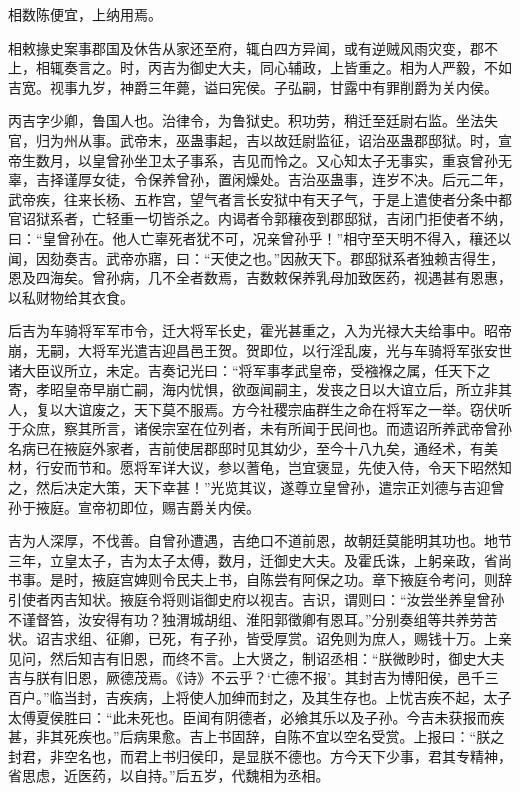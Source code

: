 \documentclass[]{article}
\begin{document}
相数陈便宜，上纳用焉。

相敕掾史案事郡国及休告从家还至府，辄白四方异闻，或有逆贼风雨灾变，郡不上，相辄奏言之。时，丙吉为御史大夫，同心辅政，上皆重之。相为人严毅，不如吉宽。视事九岁，神爵三年薨，谥曰宪侯。子弘嗣，甘露中有罪削爵为关内侯。

丙吉字少卿，鲁国人也。治律令，为鲁狱史。积功劳，稍迁至廷尉右监。坐法失官，归为州从事。武帝末，巫蛊事起，吉以故廷尉监征，诏治巫蛊郡邸狱。时，宣帝生数月，以皇曾孙坐卫太子事系，吉见而怜之。又心知太子无事实，重哀曾孙无辜，吉择谨厚女徒，令保养曾孙，置闲燥处。吉治巫蛊事，连岁不决。后元二年，武帝疾，往来长杨、五柞宫，望气者言长安狱中有天子气，于是上遣使者分条中都官诏狱系者，亡轻重一切皆杀之。内谒者令郭穰夜到郡邸狱，吉闭门拒使者不纳，曰：``皇曾孙在。他人亡辜死者犹不可，况亲曾孙乎！''相守至天明不得入，穰还以闻，因劾奏吉。武帝亦寤，曰：``天使之也。''因赦天下。郡邸狱系者独赖吉得生，恩及四海矣。曾孙病，几不全者数焉，吉数敕保养乳母加致医药，视遇甚有恩惠，以私财物给其衣食。

后吉为车骑将军军市令，迁大将军长史，霍光甚重之，入为光禄大夫给事中。昭帝崩，无嗣，大将军光遣吉迎昌邑王贺。贺即位，以行淫乱废，光与车骑将军张安世诸大臣议所立，未定。吉奏记光曰：``将军事孝武皇帝，受襁褓之属，任天下之寄，孝昭皇帝早崩亡嗣，海内忧惧，欲亟闻嗣主，发丧之日以大谊立后，所立非其人，复以大谊废之，天下莫不服焉。方今社稷宗庙群生之命在将军之一举。窃伏听于众庶，察其所言，诸侯宗室在位列者，未有所闻于民间也。而遗诏所养武帝曾孙名病已在掖庭外家者，吉前使居郡邸时见其幼少，至今十八九矣，通经术，有美材，行安而节和。愿将军详大议，参以蓍龟，岂宜褒显，先使入侍，令天下昭然知之，然后决定大策，天下幸甚！''光览其议，遂尊立皇曾孙，遣宗正刘德与吉迎曾孙于掖庭。宣帝初即位，赐吉爵关内侯。

吉为人深厚，不伐善。自曾孙遭遇，吉绝口不道前恩，故朝廷莫能明其功也。地节三年，立皇太子，吉为太子太傅，数月，迁御史大夫。及霍氏诛，上躬亲政，省尚书事。是时，掖庭宫婢则令民夫上书，自陈尝有阿保之功。章下掖庭令考问，则辞引使者丙吉知状。掖庭令将则诣御史府以视吉。吉识，谓则曰：``汝尝坐养皇曾孙不谨督笞，汝安得有功？独渭城胡组、淮阳郭徵卿有恩耳。''分别奏组等共养劳苦状。诏吉求组、征卿，已死，有子孙，皆受厚赏。诏免则为庶人，赐钱十万。上亲见问，然后知吉有旧恩，而终不言。上大贤之，制诏丞相：``朕微眇时，御史大夫吉与朕有旧恩，厥德茂焉。《诗》不云乎？`亡德不报'。其封吉为博阳侯，邑千三百户。''临当封，吉疾病，上将使人加绅而封之，及其生存也。上忧吉疾不起，太子太傅夏侯胜曰：``此未死也。臣闻有阴德者，必飨其乐以及子孙。今吉未获报而疾甚，非其死疾也。''后病果愈。吉上书固辞，自陈不宜以空名受赏。上报曰：``朕之封君，非空名也，而君上书归侯印，是显朕不德也。方今天下少事，君其专精神，省思虑，近医药，以自持。''后五岁，代魏相为丞相。
\end{document}
